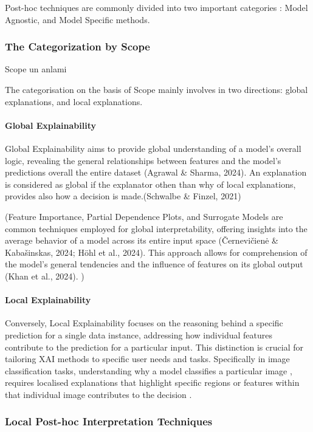 Post-hoc techniques are commonly divided into two important categories : Model Agnostic, and Model Specific methods.
\clearpage
\subsubsection{The Categorization by Scope }

Scope un anlami

The categorisation on the basis of Scope mainly involves in two directions: global explanations, and local explanations.

\paragraph{Global Explainability}


Global Explainability aims to provide global understanding of a model’s overall logic, revealing the general relationships between features and the model’s predictions overall the entire dataset (Agrawal \& Sharma, 2024). An explanation is considered as global if the explanator othen than why of local explanations, provides also how a decision is made.(Schwalbe \& Finzel, 2021)

(Feature Importance, Partial Dependence Plots, and Surrogate Models are common techniques employed for global interpretability, offering insights into the average behavior of a model across its entire input space (Černevičienė \& Kabašinskas, 2024; Höhl et al., 2024). This approach allows for comprehension of the model's general tendencies and the influence of features on its global output (Khan et al., 2024). )
\paragraph{Local Explainability }

Conversely, Local Explainability focuses on the reasoning behind a specific prediction for a single data instance, addressing how individual features contribute to the prediction for a particular input. This distinction is crucial for tailoring XAI methods to specific user needs and tasks. Specifically  in image classification tasks, understanding why a model classifies a particular image , requires localised explanations that highlight specific regions or features within that individual image contributes to the decision . 
\clearpage

\subsubsection{Local Post-hoc Interpretation Techniques }

